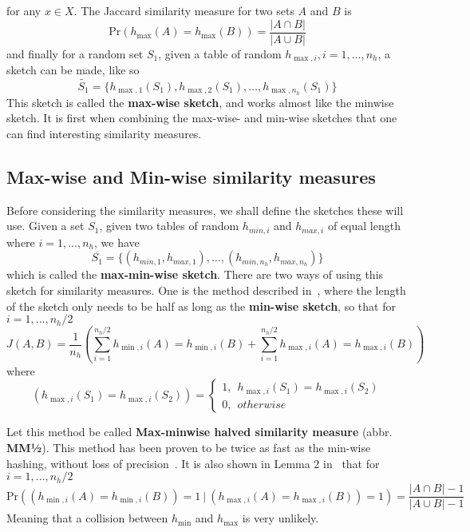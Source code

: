 \documentclass[../../main.tex]{subfiles}
\begin{document}
for any $x\in X$. The Jaccard similarity measure for two sets $A$ and $B$ is
\begin{equation}\label{maxwisejaccard}
\mathrm{Pr}(h_{\max}(A)=h_{\max}(B))=\frac{|A\cap B|}{|A\cup B|}
\end{equation}
and finally for a random set $S_1$, given a table of random $h_{\max,i},i=1,\ldots,n_h$, a sketch can be made, like so
$$
\tilde{S_1} = \{ h_{\max,1}(S_1),h_{\max,2}(S_1),\ldots,h_{\max,n_h}(S_1)\}
$$
This sketch is called the \textbf{max-wise sketch}, and works almost like the minwise sketch. It is first when combining the max-wise- and min-wise sketches that one can find interesting similarity measures. 
\subsection{Max-wise and Min-wise similarity measures}\label{sec:maxmin}
Before considering the similarity measures, we shall define the sketches these will use. Given a set $S_1$, given two tables of random $h_{min,i}$ and $h_{max,i}$ of equal length where $i=1,\ldots,n_h$, we have
\begin{equation}\label{minmaxsketch}
\overline{S_1}=\{(h_{min,1},h_{max,1}),\ldots,(h_{min,n_h},h_{max,n_h})\}
\end{equation}
which is called the \textbf{max-min-wise sketch}. There are two ways of using this sketch for similarity measures. One is the method described in~\cite{minmaxhash}, where the length of the sketch only needs to be half as long as the \textbf{min-wise sketch}, so that for $i=1,\ldots,n_h/2$
\begin{equation}\label{minmaxhalfjaccard}
J(A,B)=\frac{1}{n_h}\left(\sum_{i=1}^{n_h/2}h_{\min,i}(A) = h_{\min,i}(B) + \sum_{i=1}^{n_h/2}h_{\max,i}(A) = h_{\max,i}(B)\right)
\end{equation}
where
$$
\left(h_{\max,i}(S_1) = h_{\max,i}(S_2)\right) = \left\{ \begin{array}{ll}
												1, \ \ h_{\max,i}(S_1)=h_{\max,i}(S_2)\\
												0, \ \ otherwise
											  \end{array}\right.
$$

Let this method be called \textbf{Max-minwise halved similarity measure} (abbr. {\bf MM½}). This method has been proven to be twice as fast as the min-wise hashing, without loss of precision~\cite{minmaxhash}. It is also shown in Lemma 2 in~\cite{minmaxhash} that for $i=1,\ldots,n_h/2$
$$
\mathrm{Pr}((h_{\min,i}(A) = h_{\min,i}(B)) = 1 \ | \ (h_{\max,i}(A) = h_{\max,i}(B)) = 1) = \frac{|A\cap B|-1}{|A\cup B| -1}
$$
Meaning that a collision between $h_{\min}$ and $h_{\max}$ is very unlikely.\\
\end{document}
